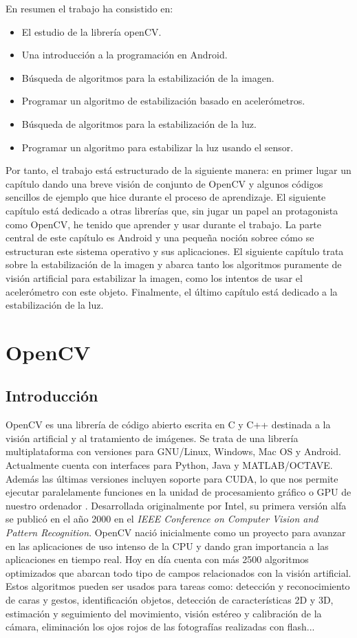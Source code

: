 \documentclass[a4paper,openright, 12pt]{book}
\begin{document}
En resumen el trabajo ha consistido en:
\begin{itemize}
\item El estudio de la librería openCV.
\item Una introducción a la programación en Android.
\item Búsqueda de algoritmos para la estabilización de la imagen.
\item Programar un algoritmo de estabilización basado en acelerómetros.
\item Búsqueda de algoritmos para la estabilización de la luz.
\item Programar un algoritmo para estabilizar la luz usando el sensor.
\end{itemize}

Por tanto, el trabajo está estructurado de la siguiente manera: en primer lugar un capítulo dando una breve visión de conjunto de OpenCV y algunos
códigos sencillos de ejemplo que hice durante el proceso de aprendizaje.
El siguiente capítulo está dedicado a otras librerías que, sin jugar un papel
an protagonista como OpenCV, he tenido que aprender y usar durante el
trabajo. La parte central de este capítulo es Android y una pequeña noción
sobree cómo se estructuran este sistema operativo y sus aplicaciones.
El siguiente capítulo trata sobre la estabilización de la imagen y abarca tanto los algoritmos puramente de visión artificial para estabilizar la imagen, como los intentos de usar el acelerómetro con este objeto. Finalmente, el último capítulo está dedicado a la estabilización de la luz.
\newline

\chapter{OpenCV} \label{cap.opencv}

\section{Introducción}
OpenCV\cite{opencvrefman} es una librería de código abierto escrita en C y C++ destinada a la visión artificial y al tratamiento de imágenes. Se trata de una librería multiplataforma con versiones para GNU/Linux, Windows, Mac OS y Android. Actualmente cuenta con interfaces para Python, Java y MATLAB/OCTAVE. Además las últimas versiones incluyen soporte para CUDA, lo que nos permite ejecutar paralelamente funciones en la unidad de procesamiento gráfico o GPU de nuestro ordenador .
Desarrollada originalmente por Intel, su primera versión alfa se publicó en el año 2000 en el \textit{IEEE Conference on Computer Vision and Pattern Recognition}. OpenCV nació inicialmente como un proyecto para avanzar en las aplicaciones de uso intenso de la CPU y dando gran importancia a las aplicaciones en tiempo real. Hoy en día cuenta con más 2500 algoritmos optimizados que abarcan todo tipo de campos relacionados con la visión artificial.
Estos algoritmos pueden ser usados para tareas como: detección y reconocimiento de caras y gestos, identificación objetos, detección de características 2D y 3D, estimación y seguimiento del movimiento, visión estéreo y calibración de la cámara, eliminación los ojos rojos de las fotografías realizadas con flash...
\end{document}
